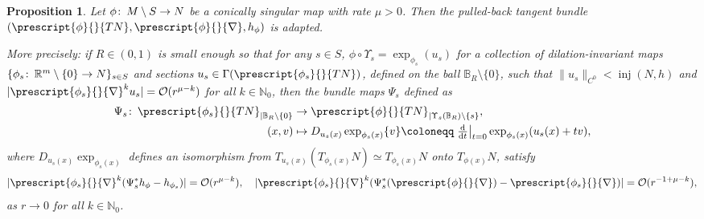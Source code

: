 \documentclass{article}
\numberwithin{equation}{section}        %
\theoremstyle{bfnote}
\newtheorem{prop}[thm]{Proposition}         %
\theoremstyle{definition}
\theoremstyle{bfremark}
\newcommand{\col}{\colon \thinspace}        %
\newcommand{\N}{\mathbb{N}}                 %
\newcommand{\R}{\mathbb{R}}                 %
\newcommand{\Ball}{\mathbb{B}}              %
\newcommand{\diff}{\mathrm{d}}                      %
\DeclareMathOperator{\inj}{inj}                 %
\begin{document}
\begin{prop}        \label{prop: The pulled-back bundle has dilation-invariant ends}
    Let $\phi \col M \setminus S \to N$ be a conically singular map with rate $\mu > 0$. Then the pulled-back tangent bundle $(\prescript{\phi}{}{TN},\prescript{\phi}{}{\nabla},h_\phi)$ is adapted. 
    
    More precisely: if $R \in (0,1)$ is small enough so that for any $s \in S$, $\phi \circ \Upsilon_s = \exp_{\phi_s}(u_s)$ for a collection of dilation-invariant maps $\{ \phi_s \col \R^m \setminus \{0\} \to N\}_{s \in S}$ and sections $u_s \in \Gamma(\prescript{\phi_s}{}{TN})$, defined on the ball $\Ball_R \setminus \{0\}$, such that $\|u_s\|_{C^0} < \inj(N,h)$ and $|\prescript{\phi_s}{}{\nabla}^k u_s | = \mathcal{O}(r^{\mu-k})$ for all $k \in \N_0$, then the bundle maps $\Psi_s$ defined as
    \begin{align*}
        \Psi_s \col \prescript{\phi_s}{}{TN}_{|\Ball_R \setminus \{0\}} & \to \prescript{\phi}{}{TN}_{|\Upsilon_s(\Ball_R) \setminus \{s\}}, \\
        (x,v) & \mapsto D_{u_s(x)} \exp_{\phi_s(x)}\{v\} \coloneqq  \left. \tfrac{\diff}{\diff t} \right|_{t=0} \exp_{\phi_s(x)}(u_s(x)+t v),
    \end{align*}
    where $D_{u_s(x)} \exp_{\phi_s(x)}$ defines an isomorphism from $T_{u_s(x)} (T_{\phi_s(x)} N) \simeq T_{\phi_s(x)} N$ onto $T_{\phi(x)} N$, satisfy
    \begin{equation*}
        |\prescript{\phi_s}{}{\nabla}^k(\Psi_s^* h_{\phi} - h_{\phi_s})| = \mathcal{O}(r^{\mu-k}), ~~~ |\prescript{\phi_s}{}{\nabla}^k(\Psi_s^* (\prescript{\phi}{}{\nabla}) - \prescript{\phi_s}{}{\nabla})| = \mathcal{O}(r^{-1+\mu-k}),
    \end{equation*}
    as $r \to 0$ for all $k \in \N_0$.
\end{prop}
\end{document}
